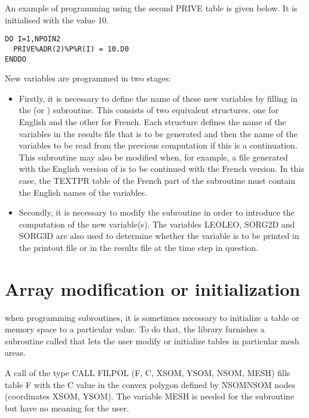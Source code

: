 An example of programming using the second PRIVE table is given below. It is
initialised with the value 10.

\begin{lstlisting}[language=TelFortran]
DO I=1,NPOIN2
  PRIVE%ADR(2)%P%R(I) = 10.D0
ENDDO
\end{lstlisting}

New variables are programmed in two stages:

\begin{itemize}
\item  Firstly, it is necessary to define the name of these new variables by
filling in the  (or )
subroutine. This consists of two equivalent structures, one for English and the
other for French. Each structure defines the name of the variables in the
results file that is to be generated and then the name of the variables to be
read from the previous computation if this is a continuation. This subroutine
may also be modified when, for example, a file generated with the English
version of  is to be continued with the French version. In this
case, the TEXTPR table of the French part of the subroutine must contain the
English names of the variables.

\item  Secondly, it is necessary to modify the 
subroutine in order to introduce the computation of the new variable(s). The
variables LEOLEO, SORG2D and SORG3D are also used to determine whether the
variable is to be printed in the printout file or in the results file at the
time step in question.
\end{itemize}


\section{Array modification or initialization}

when programming  subroutines, it is sometimes necessary to
initialize a table or memory space to a particular value. To do that, the \bief
library furnishes a subroutine called  that lets the user modify or
initialize tables in particular mesh areas.

A call of the type CALL FILPOL (F, C, XSOM, YSOM, NSOM, MESH) fills table F
with the C value in the convex polygon defined by NSOMNSOM nodes (coordinates
XSOM, YSOM). The variable MESH is needed for the  subroutine
but have no meaning for the user.


